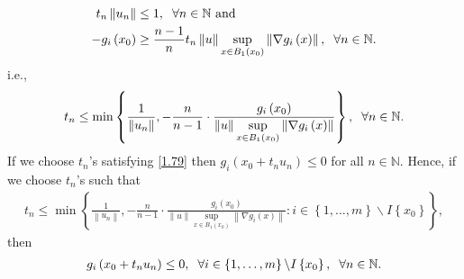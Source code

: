 \documentclass[a4paper]{article}
\numberwithin{equation}{section}
\begin{document}
\begin{enumerate}
\begin{align}
{t_n}\left\| {{u_n}} \right\| &\le 1,\hspace{0.2cm}\forall n \in \mathbb{N}\mbox{ and } \\
 - {g_i}\left( {{x_0}} \right) &\ge \frac{{n - 1}}{n}{t_n}\left\| u \right\|\mathop {\sup }\limits_{x \in {B_1}\left( {{x_0}} \right)} \left\| {\nabla {g_i}\left( x \right)} \right\|,\hspace{0.2cm}\forall n \in \mathbb{N}.
\end{align}
i.e.,
\begin{align}
\label{1.79}
{t_n} \le \min \left\{ {\frac{1}{{\left\| {{u_n}} \right\|}}, - \frac{n}{{n - 1}} \cdot \frac{{{g_i}\left( {{x_0}} \right)}}{{\left\| u \right\|\mathop {\sup }\limits_{x \in {B_1}\left( {{x_0}} \right)} \left\| {\nabla {g_i}\left( x \right)} \right\|}}} \right\},\hspace{0.2cm}\forall n \in \mathbb{N}.
\end{align}
If we choose $t_n$'s satisfying \eqref{1.79} then ${g_i}\left( {{x_0} + {t_n}{u_n}} \right) \le 0$ for all $n\in \mathbb{N}$. Hence, if we choose $t_n$'s such that
\begin{align}
\label{1.80}
{t_n} \le \min \left\{ {\frac{1}{{\left\| {{u_n}} \right\|}}, - \frac{n}{{n - 1}} \cdot \frac{{{g_i}\left( {{x_0}} \right)}}{{\left\| u \right\|\mathop {\sup }\limits_{x \in {B_1}\left( {{x_0}} \right)} \left\| {\nabla {g_i}\left( x \right)} \right\|}}:i \in \left\{ {1, \ldots ,m} \right\}\backslash I\left\{ {{x_0}} \right\}} \right\},
\end{align}
then 
\begin{align}
\label{1.81}
{g_i}\left( {{x_0} + {t_n}{u_n}} \right) \le 0,\hspace{0.2cm} \forall i \in \left\{ {1, \ldots ,m} \right\}\backslash I\left\{ {{x_0}} \right\},\hspace{0.2cm} \forall n \in \mathbb{N}.
\end{align}
\vspace{0.2cm} 


\end{enumerate}
\end{document}

